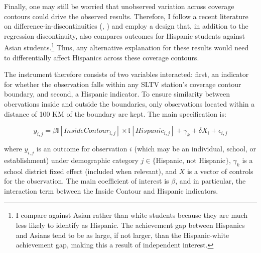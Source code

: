 \documentclass[11pt]{article}
\begin{document}
Finally, one may still be worried that unobserved variation across coverage contours could drive the observed results. Therefore, I follow a recent literature on difference-in-discontinuities (\cite{casas2015women}, \cite{grembi2016fiscal}) and employ a design that, in addition to the regression discontinuity, also compares outcomes for Hispanic students against Asian students.\footnote{ I compare against Asian rather than white students because they are much less likely to identify as Hispanic. The achievement gap between Hispanics and Asians tend to be as large, if not larger, than the Hispanic-white achievement gap, making this a result of independent interest.} Thus, any alternative explanation for these results would need to differentially affect Hispanics across these coverage contours.

The instrument therefore consists of two variables interacted: first, an indicator for whether the observation falls within any SLTV station's coverage contour boundary, and second, a Hispanic indicator. To ensure similarity between obervations inside and outside the boundaries, only observations located within a distance of 100 KM of the boundary are kept. The main specification is: %

\[ y_{i,j} =  \beta \mathbb{I}[InsideContour_{i,j}] \times \mathbb{I}[Hispanic_{i,j}] + \gamma_k + \delta  X_i + \epsilon_{i,j} \]

where $y_{i,j}$ is an outcome for observation $i$ (which may be an individual, school, or establishment) under demographic category $j \in \{$Hispanic, not Hispanic$\}$, $\gamma_k$ is a school district fixed effect (included when relevant), and $X$ is a vector of controls for the observation. The main coefficient of interest is $\beta$, and in particular, the interaction term between the Inside Contour and Hispanic indicators. 
\end{document}
